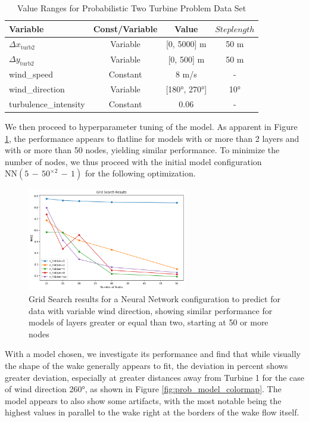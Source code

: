 \documentclass[preprint,12pt]{elsarticle}
\begin{document}
\begin{table}[ht]
	\centering
	\caption{Value Ranges for Probabilistic Two Turbine Problem Data Set}
	\begin{tabular}{|l|c|c|c|}
		\hline
		\textbf{Variable} & \textbf{Const/Variable} & \textbf{Value} & \textbf{$Steplength$}\\
		\hline
		$\Delta x_{\text{turb2}}$ & Variable & [0, 5000] m & 50 m\\
		$\Delta y_{\text{turb2}}$ & Variable & [0, 500] m  & 50 m\\
		wind\_speed & Constant & 8 m/s & -\\
		wind\_direction & Variable & [180°, 270°]& 10° \\
		turbulence\_intensity & Constant & 0.06 & - \\
		\hline
	\end{tabular}
	\label{tab:val_prob_data}
\end{table}

We then proceed to hyperparameter tuning of the model. As apparent in Figure \ref{fig:determ_nn_opti}, the performance appears to flatline for models with or more than 2 layers and with or more than 50 nodes, yielding similar performance. To minimize the number of nodes, we thus proceed with the initial model configuration $\text{NN}(5\,{-}\,50^{\times2}\,{-}\,1)$ for the following optimization.


\begin{figure}[h] 
	\centering
	\includegraphics[width=0.62\textwidth]{../figures/optimization/prob_nn_opti.png} 
	\caption{Grid Search results for a Neural Network configuration to predict for data with variable wind direction, showing similar performance for models of layers greater or equal than two, starting at 50 or more nodes}
	\label{fig:determ_nn_opti}
\end{figure}


With a model chosen, we investigate its performance and find that while visually the shape of the wake generally appears to fit, the deviation in percent shows greater deviation, especially at greater distances away from Turbine 1 for the case of wind direction 260°, as shown in Figure \ref{fig:prob_model_colormap}. The model appears to also show some artifacts, with the most notable being the highest values in parallel to the wake right at the borders of the wake flow itself.
\end{document}
